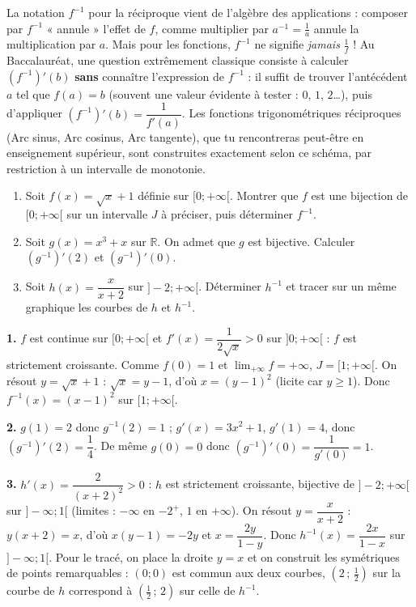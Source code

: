 \documentclass[11pt]{article}
\begin{document}
\begin{savaistu}
La notation $f^{-1}$ pour la réciproque vient de l'algèbre des applications : composer par $f^{-1}$ « annule » l'effet de $f$, comme multiplier par $a^{-1} = \frac{1}{a}$ annule la multiplication par $a$. Mais pour les fonctions, $f^{-1}$ ne signifie \emph{jamais} $\frac{1}{f}$ ! Au Baccalauréat, une question extrêmement classique consiste à calculer $(f^{-1})'(b)$ \textbf{sans} connaître l'expression de $f^{-1}$ : il suffit de trouver l'antécédent $a$ tel que $f(a) = b$ (souvent une valeur évidente à tester : $0$, $1$, $2$\ldots), puis d'appliquer $(f^{-1})'(b) = \dfrac{1}{f'(a)}$. Les fonctions trigonométriques réciproques (Arc sinus, Arc cosinus, Arc tangente), que tu rencontreras peut-être en enseignement supérieur, sont construites exactement selon ce schéma, par restriction à un intervalle de monotonie.
\end{savaistu}

\begin{exercice}
\begin{enumerate}
\item Soit $f(x) = \sqrt{x} + 1$ définie sur $[0 ; +\infty[$. Montrer que $f$ est une bijection de $[0;+\infty[$ sur un intervalle $J$ à préciser, puis déterminer $f^{-1}$.
\item Soit $g(x) = x^3 + x$ sur $\mathbb{R}$. On admet que $g$ est bijective. Calculer $(g^{-1})'(2)$ et $(g^{-1})'(0)$.
\item Soit $h(x) = \dfrac{x}{x+2}$ sur $]-2 ; +\infty[$. Déterminer $h^{-1}$ et tracer sur un même graphique les courbes de $h$ et $h^{-1}$.
\end{enumerate}
\end{exercice}

\begin{corrige}[Exercice 1]
\textbf{1.} $f$ est continue sur $[0;+\infty[$ et $f'(x) = \dfrac{1}{2\sqrt{x}} > 0$ sur $]0;+\infty[$ : $f$ est strictement croissante. Comme $f(0) = 1$ et $\lim_{+\infty} f = +\infty$, $J = [1 ; +\infty[$. On résout $y = \sqrt{x} + 1$ : $\sqrt{x} = y - 1$, d'où $x = (y-1)^2$ (licite car $y \geq 1$). Donc $f^{-1}(x) = (x-1)^2$ sur $[1 ; +\infty[$.

\textbf{2.} $g(1) = 2$ donc $g^{-1}(2) = 1$ ; $g'(x) = 3x^2 + 1$, $g'(1) = 4$, donc $(g^{-1})'(2) = \dfrac{1}{4}$. De même $g(0) = 0$ donc $(g^{-1})'(0) = \dfrac{1}{g'(0)} = 1$.

\textbf{3.} $h'(x) = \dfrac{2}{(x+2)^2} > 0$ : $h$ est strictement croissante, bijective de $]-2;+\infty[$ sur $]-\infty ; 1[$ (limites : $-\infty$ en $-2^+$, $1$ en $+\infty$). On résout $y = \dfrac{x}{x+2}$ : $y(x+2) = x$, d'où $x(y-1) = -2y$ et $x = \dfrac{2y}{1-y}$. Donc $h^{-1}(x) = \dfrac{2x}{1-x}$ sur $]-\infty ; 1[$. Pour le tracé, on place la droite $y = x$ et on construit les symétriques de points remarquables : $(0;0)$ est commun aux deux courbes, $(2\,;\,\tfrac12)$ sur la courbe de $h$ correspond à $(\tfrac12\,;\,2)$ sur celle de $h^{-1}$.
\end{corrige}
\end{document}

